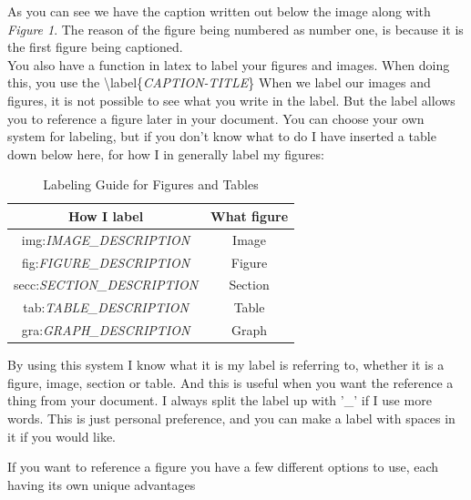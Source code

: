 \documentclass{article}
\newcommand{\bs}[1]{\textbackslash{}#1} %
\begin{document}
As you can see we have the caption written out below the image along with \textit{Figure 1}.
The reason of the figure being numbered as number one, is because it is the first figure being captioned. \\

You also have a function in latex to label your figures and images. When doing this, you use the \bs{label\{\textit{CAPTION-TITLE}\}}
When we label our images and figures, it is not possible to see what you write in the label.
But the label allows you to reference a figure later in your document. You can choose your own system for labeling, but if you don't know what to do I have inserted
a table down below here, for how I in generally label my figures: \\

\begin{table}[h]
    \centering
    \begin{tabular}{|c|c|}
        \hline
        \rowcolor{gray!30}
        How I label & What figure \\ 
        \hline
        img:\textit{IMAGE\_DESCRIPTION} & Image \\ 
        \hline
        fig:\textit{FIGURE\_DESCRIPTION} & Figure \\ 
        \hline
        secc:\textit{SECTION\_DESCRIPTION} & Section \\ 
        \hline
        tab:\textit{TABLE\_DESCRIPTION} & Table \\ 
        \hline
        gra:\textit{GRAPH\_DESCRIPTION} & Graph \\ 
        \hline
    \end{tabular}
    \caption{Labeling Guide for Figures and Tables}
    \label{tab:caption_labels}
\end{table}


By using this system I know what it is my label is referring to, whether it is a figure, image, section or table. And this is useful 
when you want the reference a thing from your document. I always split the label up with '\_' if I use more words. This is just personal preference, and you can make a
label with spaces in it if you would like.

If you want to reference a figure you have a few different options to use, each having its own unique advantages
\end{document}
